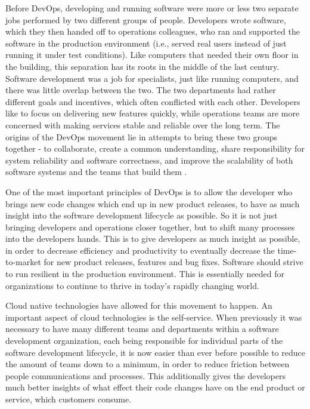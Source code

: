Before DevOps, developing and running software were more or less two separate jobs performed by two different groups of people.
Developers wrote software, which they then handed off to operations colleagues, who ran and supported the software in the production environment
(i.e., served real users instead of just running it under test conditions).
Like computers that needed their own floor in the building, this separation has its roots in the middle of the last century.
Software development was a job for specialists, just like running computers, and there was little overlap between the two.
The two departments had rather different goals and incentives, which often conflicted with each other. Developers like to focus on delivering new features quickly, while operations teams are more concerned with making services stable and reliable over the long term.
The origins of the DevOps movement lie in attempts to bring these two groups together - to collaborate, create a common understanding, share responsibility for system reliability and software correctness, and improve the scalability of both software systems and the teams that build them
\autocite{cloudNativeDevopsMitKubernetesArundel2019cloud}.


One of the most important principles of DevOps is
to allow the developer who brings new code changes
which end up in new product releases,
to have as much insight into the software development lifecycle as possible.
So it is not just bringing developers and operations closer together,
but to shift many processes into the developers hands.
This is to give developers as much insight as possible,
in order to decrease efficiency and productivity to eventually
decrease the time-to-market for new product releases, features and bug fixes.
Software should strive to run resilient in the production environment.
This is essentially needed for organizations to continue to thrive in today's
rapidly changing world.

Cloud native technologies have allowed for this movement to happen.
An important aspect of cloud technologies is the self-service.
When previously it was necessary to have many different teams and departments
within a software development organization,
each being responsible for individual parts of the 
software development lifecycle,
it is now easier than ever before possible to reduce the amount of
teams down to a minimum, in order to reduce friction between people communications and processes.
This additionally gives the developers much better insights of what effect their code changes have
on the end product or service, which customers consume.

